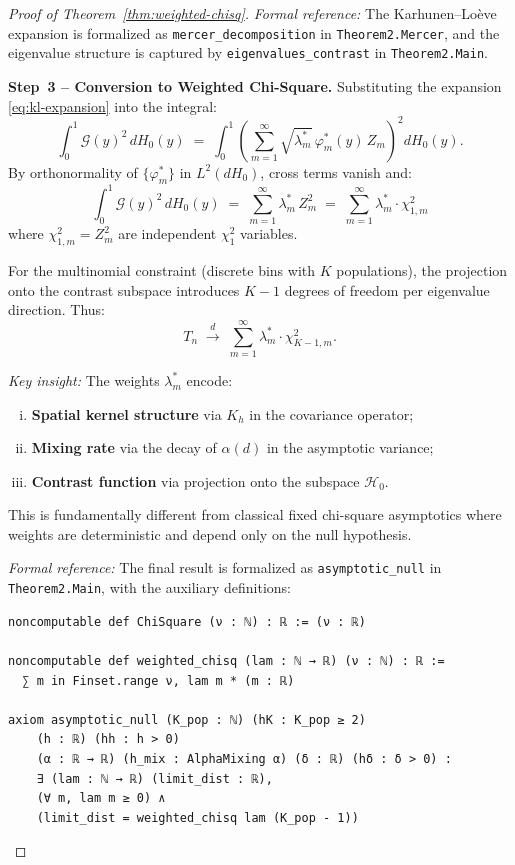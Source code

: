 \begin{proof}[Proof of Theorem~\ref{thm:weighted-chisq}]
\textit{Formal reference:} The Karhunen--Lo\`{e}ve expansion is formalized as \texttt{mercer\_decomposition} in \texttt{Theorem2.Mercer}, and the eigenvalue structure is captured by \texttt{eigenvalues\_contrast} in \texttt{Theorem2.Main}.

\textbf{Step~3 -- Conversion to Weighted Chi-Square.}
Substituting the expansion \eqref{eq:kl-expansion} into the integral:
\[
\int_0^1 \mathcal{G}(y)^2 \, dH_0(y)
\;=\; \int_0^1 \left(\sum_{m=1}^{\infty} \sqrt{\lambda_m^*} \, \varphi_m^*(y) \, Z_m\right)^2 dH_0(y).
\]
By orthonormality of $\{\varphi_m^*\}$ in $L^2(dH_0)$, cross terms vanish and:
\[
\int_0^1 \mathcal{G}(y)^2 \, dH_0(y)
\;=\; \sum_{m=1}^{\infty} \lambda_m^* \, Z_m^2
\;=\; \sum_{m=1}^{\infty} \lambda_m^* \cdot \chi^2_{1,m}
\]
where $\chi^2_{1,m} = Z_m^2$ are independent $\chi^2_1$ variables.

For the multinomial constraint (discrete bins with $K$ populations), the projection onto the contrast subspace introduces $K-1$ degrees of freedom per eigenvalue direction. Thus:
\begin{equation}
T_n \;\xrightarrow{d}\; \sum_{m=1}^{\infty} \lambda_m^* \cdot \chi^2_{K-1,m}.
\end{equation}

\textit{Key insight:} The weights $\lambda_m^*$ encode:
\begin{enumerate}[(i)]
\item \textbf{Spatial kernel structure} via $K_h$ in the covariance operator;
\item \textbf{Mixing rate} via the decay of $\alpha(d)$ in the asymptotic variance;
\item \textbf{Contrast function} via projection onto the subspace $\mathcal{H}_0$.
\end{enumerate}
This is fundamentally different from classical fixed chi-square asymptotics where weights are deterministic and depend only on the null hypothesis.

\textit{Formal reference:} The final result is formalized as \texttt{asymptotic\_null} in \texttt{Theorem2.Main}, with the auxiliary definitions:
\begin{verbatim}
noncomputable def ChiSquare (ν : ℕ) : ℝ := (ν : ℝ)

noncomputable def weighted_chisq (lam : ℕ → ℝ) (ν : ℕ) : ℝ :=
  ∑ m in Finset.range ν, lam m * (m : ℝ)

axiom asymptotic_null (K_pop : ℕ) (hK : K_pop ≥ 2)
    (h : ℝ) (hh : h > 0)
    (α : ℝ → ℝ) (h_mix : AlphaMixing α) (δ : ℝ) (hδ : δ > 0) :
    ∃ (lam : ℕ → ℝ) (limit_dist : ℝ),
    (∀ m, lam m ≥ 0) ∧
    (limit_dist = weighted_chisq lam (K_pop - 1))
\end{verbatim}
\end{proof}


